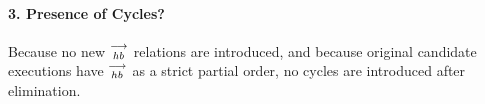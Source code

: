 \paragraph{3. Presence of Cycles?}
        
Because no new $\stackrel{\longrightarrow}{_{hb}}$ relations are introduced, and because original candidate executions have $\stackrel{\longrightarrow}{_{hb}}$ as a strict partial order, no cycles are introduced after elimination. 

